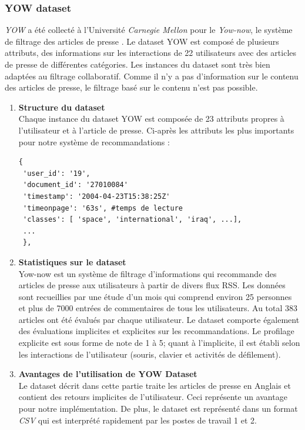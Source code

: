     \subsubsection{\textquotedbl YOW \textquotedbl dataset }
    \emph{YOW} a été collecté à l'Université \emph{Carnegie Mellon} pour le \emph{Yow-now}, le système de filtrage des articles de presse \cite{carnegieYOW}. Le dataset YOW est composé de plusieurs attributs, des informations sur les interactions de 22 utilisateurs avec des articles de presse de différentes catégories. Les instances du dataset sont très bien adaptées au filtrage collaboratif. Comme il n'y a pas d'information sur le contenu des articles de presse, le filtrage basé sur le contenu n'est pas possible. \\
    \begin{enumerate}[leftmargin=*]
        \item\textbf{Structure du dataset}\\
        Chaque instance du dataset YOW est composée de 23 attributs propres à l'utilisateur et à l'article de presse. Ci-après les attributs les plus importants pour notre système de recommandations :  \\
\begin{lstlisting}[style=code] 
 {
 'user_id': '19', 
 'document_id': '27010084'
 'timestamp': '2004-04-23T15:38:25Z'
 'timeonpage': '63s', #temps de lecture
 'classes': [ 'space', 'international', 'iraq', ...],
 ...
 },
\end{lstlisting}
    \item\textbf{Statistiques sur le dataset}\\
    Yow-now est un système de filtrage d'informations qui recommande des articles de presse aux utilisateurs à partir de divers flux RSS. Les données sont recueillies par une étude d'un mois qui comprend environ 25 personnes et plus de 7000 entrées de commentaires de tous les utilisateurs. Au total 383 articles ont été évalués par chaque utilisateur. Le dataset comporte également des évaluations implicites et explicites sur les recommandations. Le profilage explicite est sous forme de note de 1 à 5; quant à l'implicite, il est établi selon les interactions de l'utilisateur (souris, clavier et activités de défilement).\\

    \item\textbf{Avantages de l'utilisation de \textquotedbl YOW Dataset\textquotedbl}\\
     Le dataset décrit dans cette partie traite les articles de presse en Anglais et contient des retours implicites de l'utilisateur. Ceci représente un avantage pour notre implémentation. De plus, le dataset est représenté dans un format \emph{CSV} qui est interprété rapidement par les postes de travail 1 et 2.\\
\end{enumerate}

